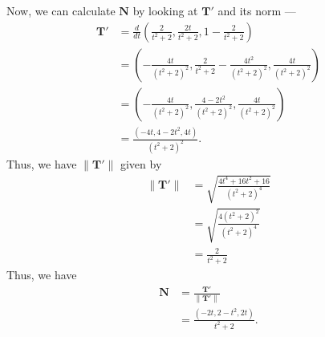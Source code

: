 \documentclass[12 pt, letterpaper]{hmcpset}
\begin{document}
\begin{solution}
\begin{enumerate}
			Now, we can calculate $\mathbf{N}$ by looking at $\mathbf{T}'$ and its norm ---
			\[
				\begin{split}
					\mathbf{T}' & = \frac{d}{dt} \left ( \frac{2}{t^{2} + 2}, \frac{2t}{t^{2} + 2}, 1 - \frac{2}{t^{2} + 2} \right ) \\
						    & = \left ( - \frac{4t}{(t^{2} + 2)^{2}}, \frac{2}{t^{2} + 2} - \frac{4t^{2}}{(t^{2} + 2)^{2}}, \frac{4t}{(t^{2} + 2)^{2}} \right ) \\
						    & = \left ( - \frac{4t}{(t^{2} + 2)^{2}}, \frac{4 - 2t^{2}}{(t^{2} + 2)^{2}}, \frac{4t}{(t^{2} + 2)^{2}} \right ) \\
						    & = \frac{(-4t, 4 - 2t^{2}, 4t)}{(t^{2} + 2)^{2}}.
				\end{split}
			\]
			Thus, we have $\lVert \mathbf{T}' \rVert$ given by
			\[
				\begin{split}
					\lVert \mathbf{T}' \rVert & = \sqrt{\frac{4t^{4} + 16t^{2} + 16}{(t^{2} + 2)^{4}}} \\
								 & = \sqrt{\frac{4(t^{2} + 2)^{2}}{(t^{2} + 2)^{4}}} \\
								 & = \frac{2}{t^{2} + 2}
				\end{split}
			\]
			Thus, we have
			\[
				\begin{split}
					\mathbf{N} & = \frac{\mathbf{T}'}{\lVert \mathbf{T}' \rVert} \\
						   & = \frac{(-2t, 2 - t^{2}, 2t)}{t^{2} + 2}.
				\end{split}
			\] 


\end{enumerate}
\end{solution}
\end{document}
